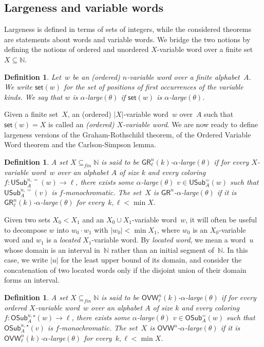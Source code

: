 \documentclass{article}
\numberwithin{theorem}{section}
\newtheorem{definition}[theorem]{Definition}
\newcommand{\OVW}{\mathsf{OVW}}
\newcommand{\GR}{\mathsf{GR}}
\newcommand{\NN}{\mathbb{N}}
\newcommand{\OSub}{\mathsf{OSub}}
\newcommand{\USub}{\mathsf{USub}}
\newcommand{\set}{\mathsf{set}}
\begin{document}
\subsection{Largeness and variable words}

Largeness is defined in terms of sets of integers, while the considered theorems are statements about words and variable words. We bridge the two notions by defining the notions of ordered and unordered $X$-variable word over a finite set~$X \subseteq \NN$.

\begin{definition}
Let~$w$ be an (ordered) $n$-variable word over a finite alphabet~$A$.
We write $\set(w)$ for the set of positions of first occurrences of the variable kinds.
We say that $w$ is \emph{$\alpha$-large$(\theta)$} if $\set(w)$ is $\alpha$-large$(\theta)$.
\end{definition}

Given a finite set~$X$, an (ordered) $|X|$-variable word~$w$ over~$A$ such that $\set(w) = X$ is called an \emph{(ordered) $X$-variable word}. We are now ready to define largeness versions of the Graham-Rothschild theorem, of the Ordered Variable Word theorem and the Carlson-Simpson lemma.

\begin{definition}
A set $X \subseteq_{fin} \NN$ is said to be \emph{$\GR^n_\ell(k)$-$\alpha$-large$(\theta)$} if for every $X$-variable word~$w$ over an alphabet $A$ of size $k$ and every coloring $f : \USub^{n,=}_A(w) \to \ell$, there exists some $\alpha$-large$(\theta)$ $v \in \USub^{=}_A(w)$ such that $\USub^{n,=}_A(v)$ is $f$-monochromatic. The set~$X$ is \emph{$\GR^n$-$\alpha$-large$(\theta)$ if it is $\GR^n_\ell(k)$-$\alpha$-large$(\theta)$ for every~$k, \ell < \min X$.}
\end{definition}

Given two sets $X_0 < X_1$ and an $X_0 \cup X_1$-variable word~$w$, it will often be useful to decompose $w$ into $w_0 \cdot w_1$ with $|w_0| < \min X_1$, where $w_0$ is an $X_0$-variable word and $w_1$ is a \emph{located} $X_1$-variable word. By \emph{located word}, we mean a word~$u$ whose domain is an interval in~$\NN$ rather than an initial segment of~$\NN$. In this case, we write $|u|$ for the least upper bound of its domain, and consider the concatenation of two located words only if the disjoint union of their domain forms an interval.

\begin{definition}
A set $X \subseteq_{fin} \NN$ is said to be \emph{$\OVW^n_\ell(k)$-$\alpha$-large$(\theta)$} if for every ordered $X$-variable word~$w$ over an alphabet $A$ of size $k$ and every coloring $f : \OSub^{n,\star}_{A}(w) \to \ell$, there exists some $\alpha$-large$(\theta)$ $v \in \OSub^{=}_{A}(w)$ such that $\OSub^{n,\star}_{A}(v)$ is $f$-monochromatic. The set~$X$ is \emph{$\OVW^n$-$\alpha$-large$(\theta)$ if it is $\OVW^n_\ell(k)$-$\alpha$-large$(\theta)$ for every~$k, \ell < \min X$.}
\end{definition}
\end{document}
